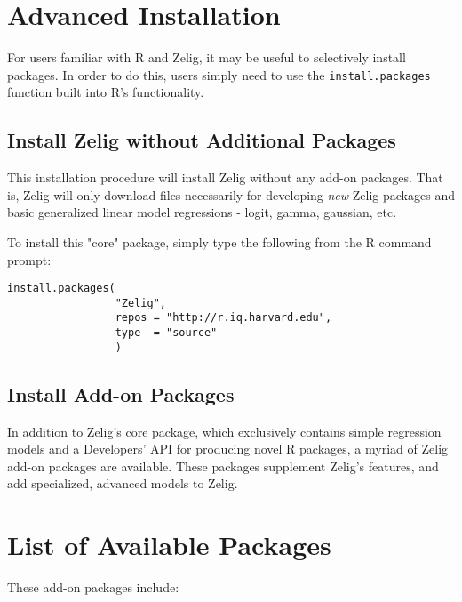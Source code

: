 %
%
\section{Advanced Installation}

For users familiar with R and Zelig, it may be useful to selectively install packages. In order to do this, users simply need to use the {\tt install.packages} function built into R's functionality.

\subsection{Install Zelig without Additional Packages}
This installation procedure will install Zelig without any add-on packages. That is, Zelig will only download files necessarily for developing \emph{new} Zelig packages and basic generalized linear model regressions - logit, gamma, gaussian, etc.

To install this "core" package, simply type the following from the R command prompt:
\begin{verbatim}
install.packages(
                 "Zelig",
                 repos = "http://r.iq.harvard.edu",
                 type  = "source"
                 )
\end{verbatim}

\subsection{Install Add-on Packages}

In addition to Zelig's core package, which exclusively contains simple regression models and a Developers' API for producing novel R packages, a myriad of Zelig add-on packages are available. These packages supplement Zelig's features, and add specialized, advanced models to Zelig.

\section{List of Available Packages}

These add-on packages include:

